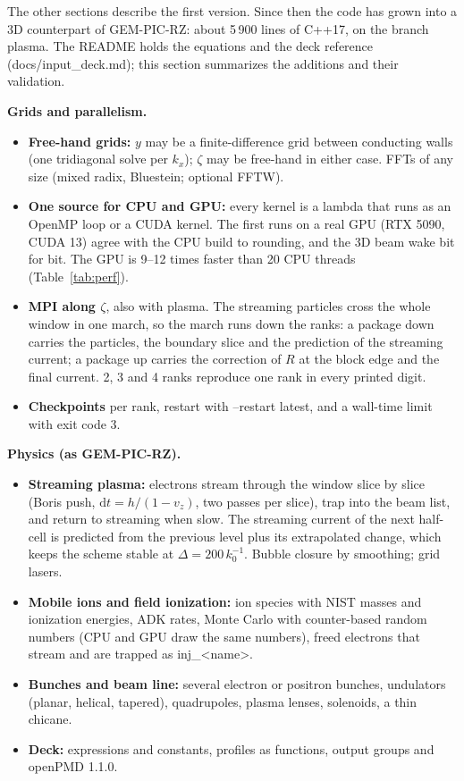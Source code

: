 \documentclass[11pt,a4paper]{article}
\newcommand{\code}[1]{{\fontencoding{OT1}\fontfamily{cmtt}\selectfont #1}}
\begin{document}
The other sections describe the first version. Since then the code has grown into a 3D counterpart of GEM-PIC-RZ: about 5\,900 lines of C++17, on the branch \code{plasma}. The README holds the equations and the deck reference (\code{docs/input\_deck.md}); this section summarizes the additions and their validation.

\textbf{Grids and parallelism.}
\begin{itemize}
\item \textbf{Free-hand grids:} $y$ may be a finite-difference grid between conducting walls (one tridiagonal solve per $k_x$); $\zeta$ may be free-hand in either case. FFTs of any size (mixed radix, Bluestein; optional FFTW).
\item \textbf{One source for CPU and GPU:} every kernel is a lambda that runs as an OpenMP loop or a CUDA kernel. The first runs on a real GPU (RTX 5090, CUDA 13) agree with the CPU build to rounding, and the 3D beam wake bit for bit. The GPU is 9--12 times faster than 20 CPU threads (Table~\ref{tab:perf}).
\item \textbf{MPI along $\zeta$}, also with plasma. The streaming particles cross the whole window in one march, so the march runs down the ranks: a package down carries the particles, the boundary slice and the prediction of the streaming current; a package up carries the correction of $R$ at the block edge and the final current. 2, 3 and 4 ranks reproduce one rank in every printed digit.
\item \textbf{Checkpoints} per rank, restart with \code{--restart latest}, and a wall-time limit with exit code 3.
\end{itemize}

\textbf{Physics (as GEM-PIC-RZ).}
\begin{itemize}
\item \textbf{Streaming plasma:} electrons stream through the window slice by slice (Boris push, $\mathrm d t=h/(1-v_z)$, two passes per slice), trap into the beam list, and return to streaming when slow. The streaming current of the next half-cell is predicted from the previous level plus its extrapolated change, which keeps the scheme stable at $\Delta=200\,k_0^{-1}$. Bubble closure by smoothing; grid lasers.
\item \textbf{Mobile ions and field ionization:} ion species with NIST masses and ionization energies, ADK rates, Monte Carlo with counter-based random numbers (CPU and GPU draw the same numbers), freed electrons that stream and are trapped as \code{inj\_<name>}.
\item \textbf{Bunches and beam line:} several electron or positron bunches, undulators (planar, helical, tapered), quadrupoles, plasma lenses, solenoids, a thin chicane.
\item \textbf{Deck:} expressions and constants, profiles as functions, output groups and openPMD 1.1.0.
\end{itemize}
\end{document}
